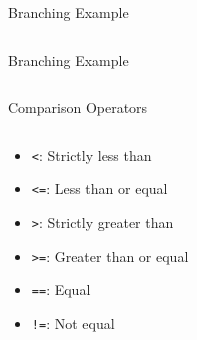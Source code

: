         \begin{frame}{Branching Example}
            \LARGE
            \inputminted[frame=single,framesep=2pt]{python3}{code-examples/branching_example.py}
        \end{frame}

        \begin{frame}{Branching Example}
            \LARGE
            \inputminted[frame=single,framesep=2pt]{python3}{code-examples/branching_example2.py}
        \end{frame}

        \begin{frame}{Comparison Operators}
            \LARGE
            \begin{columns}
                \begin{column}{0.4\textwidth}
                    \begin{itemize}
                        \item \texttt{<}: Strictly less than
                        \item \texttt{<=}: Less than or equal
                        \item \texttt{>}: Strictly greater than
                        \item \texttt{>=}: Greater than or equal
                        \item \texttt{==}: Equal
                        \item \texttt{!=}: Not equal
                    \end{itemize}
                \end{column}
                \begin{column}{0.6\textwidth}
                    \inputminted[frame=single,framesep=2pt]{python3}{code-examples/comparison.py}
                \end{column}
            \end{columns}
        \end{frame}

